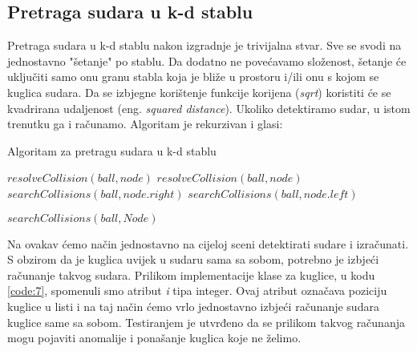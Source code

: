 \subsection{Pretraga sudara u k-d stablu}
Pretraga sudara u k-d stablu nakon izgradnje je trivijalna stvar. Sve se svodi na jednostavno "šetanje" po stablu. Da dodatno ne povećavamo složenost, šetanje će uključiti samo onu granu stabla koja je bliže u prostoru i/ili onu s kojom se kuglica sudara. Da se izbjegne korištenje funkcije korijena (\emph{sqrt}) koristiti će se kvadrirana udaljenost (eng. \emph{squared distance}). Ukoliko detektiramo sudar, u istom trenutku ga i računamo. Algoritam je rekurzivan i glasi:\newpage
\begin{algorithm}
	\caption{Algoritam za pretragu sudara u k-d stablu}
	\label{alg:serch_collisions_kd}
	\begin{algorithmic}	
		\State $resolveCollision(ball,node)$
		\EndIf
		\Return
		\EndIf
			$resolveCollision(ball,node)$
		\EndIf
		\State $searchCollisions(ball, node.right)$
		\State $searchCollisions(ball, node.left)$
		\EndIf
		\EndFunction
		
		\State $searchCollisions(ball,Node)$
		\EndFor
		\EndFunction

	\end{algorithmic}
\end{algorithm}
Na ovakav ćemo način jednostavno na cijeloj sceni detektirati sudare i izračunati. S obzirom da je kuglica uvijek u sudaru sama sa sobom, potrebno je izbjeći računanje takvog sudara. Prilikom implementacije klase za kuglice, u kodu \ref{code:7}, spomenuli smo atribut \emph{i} tipa integer. Ovaj atribut označava poziciju kuglice u listi i na taj način ćemo vrlo jednostavno izbjeći računanje sudara kuglice same sa sobom. Testiranjem je utvrđeno da se prilikom takvog računanja mogu pojaviti anomalije i ponašanje kuglica koje ne želimo.\newpage
